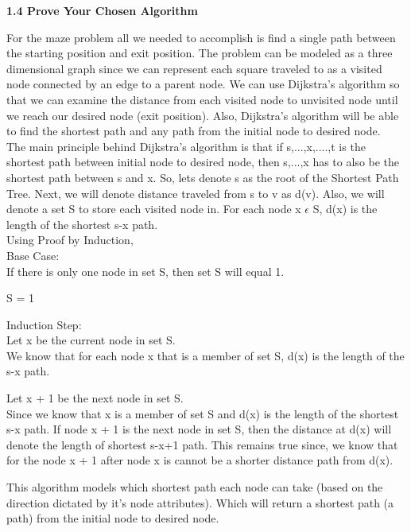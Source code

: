 \documentclass[12pt]{article}
\begin{document}
\textbf{1.4 Prove Your Chosen Algorithm}

For the maze problem all we needed to accomplish is find a single path between the starting position and exit position. The problem can be modeled as a three dimensional graph since we can represent each square traveled to as a visited node connected by an edge to a parent node. We can use Dijkstra's algorithm so that we can examine the distance from each visited node to unvisited node until we reach our desired node (exit position). Also, Dijkstra's algorithm will be able to find the shortest path and any path from the initial node to desired node. \\

The main principle behind Dijkstra's algorithm is that if s,...,x,....,t is the shortest path between initial node to desired node, then s,...,x has to also be the shortest path between s and x. So, lets denote s as the root of the Shortest Path Tree. Next, we will denote distance traveled from s to v as d(v). Also, we will denote a set S to store each visited node in. For each node x $\epsilon$ S, d(x) is the length of the shortest s-x path. \\

Using Proof by Induction, \\

Base Case: \\
If there is only one node in set S, then set S will equal 1.

S = 1

Induction Step: \\
Let x be the current node in set S. \\

We know that for each node x that is a member of set S, d(x) is the length of the s-x path.

Let x + 1 be the next node in set S. \\

Since we know that x is a member of set S and d(x) is the length of the shortest s-x path. If node x + 1 is the next node in set S, then the distance at d(x) will denote the length of shortest s-x+1 path. This remains true since, we know that for the node x + 1 after node x is cannot be a shorter distance path from d(x).

This algorithm models which shortest path each node can take (based on the direction dictated by it's node attributes). Which will return a shortest path (a path) from the initial node to desired node.
\end{document}
